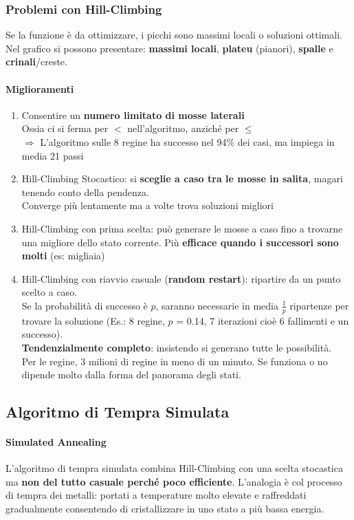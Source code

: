 \documentclass[10pt]{book}
\begin{document}
\subsubsection{Problemi con Hill-Climbing}
Se la funzione è da ottimizzare, i picchi sono massimi locali o soluzioni ottimali. Nel grafico si possono presentare: \textbf{massimi locali}, \textbf{plateu} (pianori), \textbf{spalle} e \textbf{crinali}/creste.
\paragraph{Miglioramenti}
\begin{enumerate}
	\item Consentire un \textbf{numero limitato di mosse laterali}\\
	Ossia ci si ferma per $<$ nell'algoritmo, anziché per $\leq$\\
	$\Rightarrow$ L'algoritmo sulle 8 regine ha successo nel 94\% dei casi, ma impiega in media 21 passi
	\item Hill-Climbing Stocastico: si \textbf{sceglie a caso tra le mosse in salita}, magari tenendo conto della pendenza.\\
	Converge più lentamente ma a volte trova soluzioni migliori
	\item Hill-Climbing con prima scelta: può generare le mosse a caso fino a trovarne una migliore dello stato corrente. Più \textbf{efficace quando i successori sono molti} (es: migliaia)
	\item Hill-Climbing con riavvio casuale (\textbf{random restart}): ripartire da un punto scelto a caso.\\
	Se la probabilità di successo è $p$, saranno necessarie in media $\frac{1}{p}$ ripartenze per trovare la soluzione (Es.: 8 regine, $p$ = 0.14, 7 iterazioni cioè 6 fallimenti e un successo).\\
	\textbf{Tendenzialmente completo}: insistendo si generano tutte le possibilità.\\
	Per le regine, 3 milioni di regine in meno di un minuto. Se funziona o no dipende molto dalla forma del panorama degli stati.
\end{enumerate}
\subsection{Algoritmo di Tempra Simulata}
\paragraph{Simulated Annealing} L'algoritmo di tempra simulata combina Hill-Climbing con una scelta stocastica ma \textbf{non del tutto casuale perché poco efficiente}. L'analogia è col processo di tempra dei metalli: portati a temperature molto elevate e raffreddati gradualmente consentendo di cristallizzare in uno stato a più bassa energia.
\end{document}
